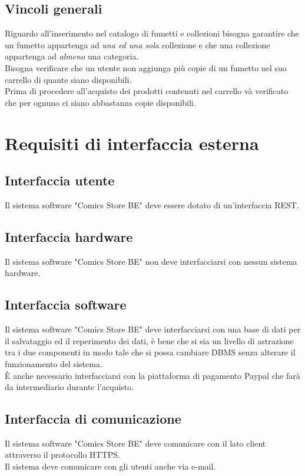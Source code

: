 \documentclass{scrreprt}
\begin{document}
\section{Vincoli generali}
Riguardo all'inserimento nel catalogo di fumetti e collezioni bisogna garantire che un fumetto appartenga ad
\emph{una ed una sola} collezione e che una collezione appartenga ad \emph{almeno} una categoria.\\
Bisogna verificare che un utente non aggiunga più copie di un fumetto nel suo carrello di quante siano disponibili.\\
Prima di procedere all'acquisto dei prodotti contenuti nel carrello và verificato che per ognuno ci siano abbastanza
copie disponibili.


\chapter{Requisiti di interfaccia esterna}

\section{Interfaccia utente}
Il sistema software "Comics Store BE" deve essere dotato di un'interfaccia REST.

\section{Interfaccia hardware}
Il sistema software "Comics Store BE" non deve interfacciarsi con nessun sistema hardware.

\section{Interfaccia software}
Il sistema software "Comics Store BE" deve interfacciarsi con una base di dati per il salvataggio ed il reperimento
dei dati, è bene che si sia un livello di astrazione tra i due componenti in modo tale che si possa cambiare DBMS senza
alterare il funzionamento del sistema.\\
È anche necessario interfacciarsi con la piattaforma di pagamento Paypal che farà da intermediario durante l'acquisto.

\section{Interfaccia di comunicazione}
Il sistema software "Comics Store BE" deve comunicare con il lato client attraverso il protocollo HTTPS.\\
Il sistema deve comunicare con gli utenti anche via e-mail.
\end{document}
